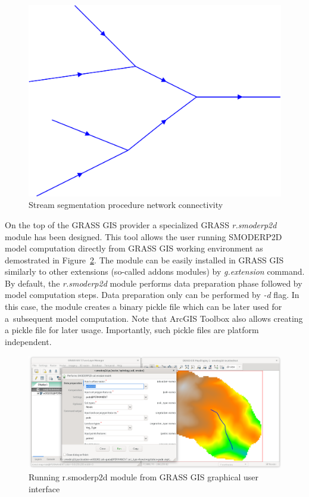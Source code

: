 \begin{figure}[ht!]
  \begin{center}
    \includegraphics[width=0.6\columnwidth]{figures/stream_next_edge}
    \caption{Stream segmentation procedure network connectivity}
    \label{fig:stream_next_edge}
  \end{center}
\end{figure}

On the top of the GRASS GIS provider a specialized GRASS {\em r.smoderp2d}
module has been designed. This tool allows the user running SMODERP2D
model computation directly from GRASS GIS working environment as
demostrated in Figure~\ref{fig:r.smoderp2d}. The module can be easily
installed in GRASS GIS similarly to other extensions (so-called addons
modules) by {\em g.extension} command. By default, the {\em
  r.smoderp2d} module performs data preparation phase followed by
model computation steps. Data preparation only can be performed by
{\em -d} flag. In this case, the module creates a binary pickle file
which can be later used for a~subsequent model computation. Note that
ArcGIS Toolbox also allows creating a pickle file for later
usage. Importantly, such pickle files are platform independent.

\begin{figure}[ht!]
  \begin{center}
    \includegraphics[width=1.0\columnwidth]{figures/smoderp2d_grass.png}
    \caption{Running r.smoderp2d module from GRASS GIS graphical user interface}
    \label{fig:r.smoderp2d}
  \end{center}
\end{figure}

